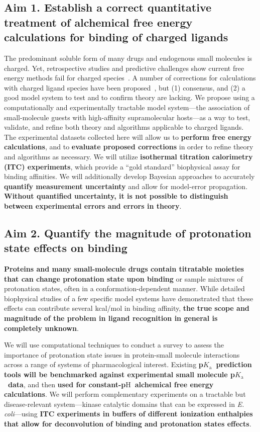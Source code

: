 \documentclass[10pt,final]{article}
\newcommand{\pKa}{p$K_\mathrm{a}$\ }
\newcommand{\pH}{p$\mathrm{H}$\ }
\begin{document}
\subsection*{Aim 1. Establish a correct quantitative treatment of alchemical free energy calculations for binding of charged ligands}
The predominant soluble form of many drugs and endogenous small molecules is charged.
Yet, retrospective studies and predictive challenges show current free energy methods fail for charged species~\cite{Rocklin2013b,Muddana2014a}.
A number of corrections for calculations with charged ligand species have been proposed~\cite{Reif2013a,Rocklin2013a, Lin2014a}, but (1) consensus, and (2) a good model system to test and to confirm theory are lacking.
We propose using a computationally and experimentally tractable model system---the association of small-molecule guests with high-affinity supramolecular hosts---as a way to test, validate, and refine both theory and algorithms applicable to charged ligands.
The experimental datasets collected here will allow us to \textbf{ perform free energy calculations}, and to \textbf{ evaluate proposed corrections} in order to refine theory and algorithms as necessary.
We will utilize \textbf{ isothermal titration calorimetry (ITC) experiments}, which provide a “gold standard” biophysical assay for binding affinities.
We will additionally develop Bayesian approaches to accurately \textbf{ quantify measurement uncertainty} and allow for model-error propagation. \textbf{Without quantified uncertainty, it is not possible to distinguish between experimental errors and errors in theory}.

\subsection*{Aim 2. Quantify the magnitude of protonation state effects on binding}
\textbf{Proteins and many small-molecule drugs contain titratable moieties that can change protonation state upon binding} or sample mixtures of protonation states, often in a conformation-dependent manner.
While detailed biophysical studies of a few specific model systems have demonstrated that these effects can contribute several kcal/mol in binding affinity, \textbf{the true scope and magnitude of the problem in ligand recognition in general is completely unknown}.

We will use computational techniques to conduct a survey to assess the importance of protonation state issues in protein-small molecule interactions across a range of systems of pharmacological interest.
Existing \textbf{ \pKa prediction tools will be benchmarked against experimental small molecule \pKa data}, and then \textbf{ used for constant-\pH alchemical free energy calculations}.
We will perform complementary experiments on a tractable but disease-relevant system---kinase catalytic domains that can be expressed in \textit{E. coli}---using \textbf{ ITC experiments in buffers of different ionization enthalpies that allow for deconvolution of binding and protonation states effects}.
\end{document}

